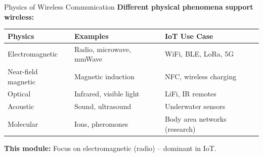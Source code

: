 \documentclass[aspectratio=169,11pt]{beamer}
\begin{document}
\begin{frame}{Physics of Wireless Communication}
    \textbf{Different physical phenomena support wireless:}
    
    \vspace{0.3cm}
    \begin{table}
        \centering
        \small
        \begin{tabular}{@{}p{3cm}p{4cm}p{5cm}@{}}
            \toprule
            \textbf{Physics} & \textbf{Examples} & \textbf{IoT Use Case} \\
            \midrule
            Electromagnetic & Radio, microwave, mmWave & WiFi, BLE, LoRa, 5G \\
            \addlinespace
            Near-field magnetic & Magnetic induction & NFC, wireless charging \\
            \addlinespace
            Optical & Infrared, visible light & LiFi, IR remotes \\
            \addlinespace
            Acoustic & Sound, ultrasound & Underwater sensors \\
            \addlinespace
            Molecular & Ions, pheromones & Body area networks (research) \\
            \bottomrule
        \end{tabular}
    \end{table}
    
    \vspace{0.3cm}
    \textbf{This module:} Focus on electromagnetic (radio) -- dominant in IoT.
\end{frame}
\end{document}
